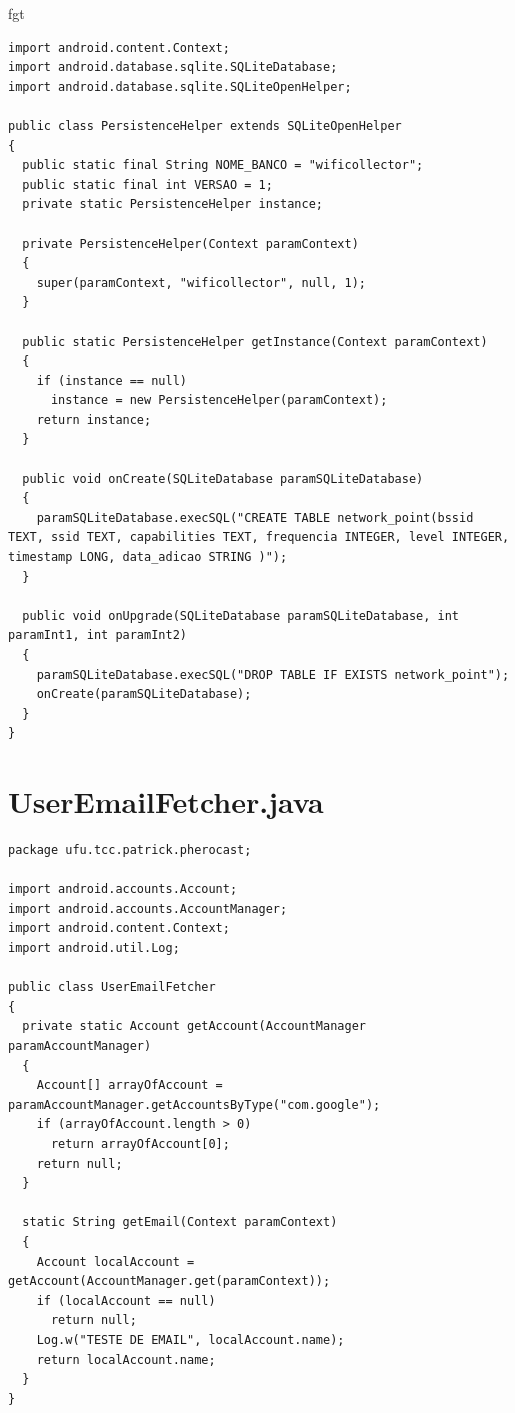 fgt\documentclass[12pt, %
openright, 
oneside, %
a4paper,    %
brazil]{facom-ufu-abntex2}
\begin{document}
\begin{anexosenv}
\begin{lstlisting}
import android.content.Context;
import android.database.sqlite.SQLiteDatabase;
import android.database.sqlite.SQLiteOpenHelper;

public class PersistenceHelper extends SQLiteOpenHelper
{
  public static final String NOME_BANCO = "wificollector";
  public static final int VERSAO = 1;
  private static PersistenceHelper instance;

  private PersistenceHelper(Context paramContext)
  {
    super(paramContext, "wificollector", null, 1);
  }

  public static PersistenceHelper getInstance(Context paramContext)
  {
    if (instance == null)
      instance = new PersistenceHelper(paramContext);
    return instance;
  }

  public void onCreate(SQLiteDatabase paramSQLiteDatabase)
  {
    paramSQLiteDatabase.execSQL("CREATE TABLE network_point(bssid TEXT, ssid TEXT, capabilities TEXT, frequencia INTEGER, level INTEGER, timestamp LONG, data_adicao STRING )");
  }

  public void onUpgrade(SQLiteDatabase paramSQLiteDatabase, int paramInt1, int paramInt2)
  {
    paramSQLiteDatabase.execSQL("DROP TABLE IF EXISTS network_point");
    onCreate(paramSQLiteDatabase);
  }
}

\end{lstlisting}
\section{UserEmailFetcher.java}
\begin{lstlisting}
package ufu.tcc.patrick.pherocast;

import android.accounts.Account;
import android.accounts.AccountManager;
import android.content.Context;
import android.util.Log;

public class UserEmailFetcher
{
  private static Account getAccount(AccountManager paramAccountManager)
  {
    Account[] arrayOfAccount = paramAccountManager.getAccountsByType("com.google");
    if (arrayOfAccount.length > 0)
      return arrayOfAccount[0];
    return null;
  }

  static String getEmail(Context paramContext)
  {
    Account localAccount = getAccount(AccountManager.get(paramContext));
    if (localAccount == null)
      return null;
    Log.w("TESTE DE EMAIL", localAccount.name);
    return localAccount.name;
  }
}

\end{lstlisting}

\end{anexosenv}


\printindex
\end{document}
